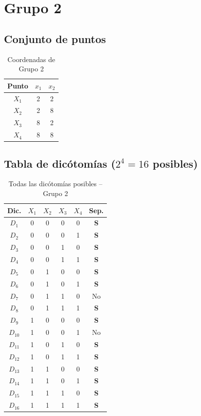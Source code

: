 \documentclass[12pt,a4paper]{article}
\begin{document}
\section{Grupo 2}
\subsection{Conjunto de puntos}
\begin{table}[H]\centering
  \caption{Coordenadas de Grupo 2}
  \begin{tabular}{ccc}\toprule
    \textbf{Punto} & \textbf{$x_1$} & \textbf{$x_2$}\\\midrule
    $X_{1}$ & 2 & 2 \\
    $X_{2}$ & 2 & 8 \\
    $X_{3}$ & 8 & 2 \\
    $X_{4}$ & 8 & 8 \\
  \bottomrule\end{tabular}
\end{table}

\subsection{Tabla de dic\'otom\'ias ($2^{4}=16$ posibles)}
\begin{table}[H]\centering
  \caption{Todas las dic\'otom\'ias posibles -- Grupo 2}
  \begin{tabular}{cccccc}\toprule
    \textbf{Dic.} & $X_{1}$ & $X_{2}$ & $X_{3}$ & $X_{4}$ & \textbf{Sep.}\\\midrule
    $D_{1}$ & 0 & 0 & 0 & 0 & \textbf{S} \\
    $D_{2}$ & 0 & 0 & 0 & 1 & \textbf{S} \\
    $D_{3}$ & 0 & 0 & 1 & 0 & \textbf{S} \\
    $D_{4}$ & 0 & 0 & 1 & 1 & \textbf{S} \\
    $D_{5}$ & 0 & 1 & 0 & 0 & \textbf{S} \\
    $D_{6}$ & 0 & 1 & 0 & 1 & \textbf{S} \\
    $D_{7}$ & 0 & 1 & 1 & 0 & No \\
    $D_{8}$ & 0 & 1 & 1 & 1 & \textbf{S} \\
    $D_{9}$ & 1 & 0 & 0 & 0 & \textbf{S} \\
    $D_{10}$ & 1 & 0 & 0 & 1 & No \\
    $D_{11}$ & 1 & 0 & 1 & 0 & \textbf{S} \\
    $D_{12}$ & 1 & 0 & 1 & 1 & \textbf{S} \\
    $D_{13}$ & 1 & 1 & 0 & 0 & \textbf{S} \\
    $D_{14}$ & 1 & 1 & 0 & 1 & \textbf{S} \\
    $D_{15}$ & 1 & 1 & 1 & 0 & \textbf{S} \\
    $D_{16}$ & 1 & 1 & 1 & 1 & \textbf{S} \\
  \bottomrule\end{tabular}
\end{table}
\end{document}
